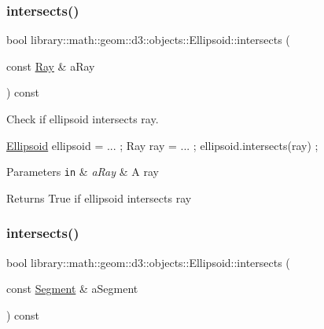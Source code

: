\subsubsection{\texorpdfstring{intersects()}{intersects()}\hspace{0.1cm}{\footnotesize\ttfamily [4/10]}}
{\footnotesize\ttfamily bool library\+::math\+::geom\+::d3\+::objects\+::\+Ellipsoid\+::intersects (\begin{DoxyParamCaption}\item[{const \hyperlink{classlibrary_1_1math_1_1geom_1_1d3_1_1objects_1_1_ray}{Ray} \&}]{a\+Ray }\end{DoxyParamCaption}) const}



Check if ellipsoid intersects ray. 


\begin{DoxyCode}
\hyperlink{classlibrary_1_1math_1_1geom_1_1d3_1_1objects_1_1_ellipsoid_aae81fe0edc7f0e8d4590ea89ae73cb14}{Ellipsoid} ellipsoid = ... ;
Ray ray = ... ;
ellipsoid.intersects(ray) ;
\end{DoxyCode}



\begin{DoxyParams}[1]{Parameters}
\mbox{\tt in}  & {\em a\+Ray} & A ray \\
\hline
\end{DoxyParams}
\begin{DoxyReturn}{Returns}
True if ellipsoid intersects ray 
\end{DoxyReturn}
\mbox{\label{classlibrary_1_1math_1_1geom_1_1d3_1_1objects_1_1_ellipsoid_a6d447b106d193af47c6b201f7e01bd26}} 
\subsubsection{\texorpdfstring{intersects()}{intersects()}\hspace{0.1cm}{\footnotesize\ttfamily [5/10]}}
{\footnotesize\ttfamily bool library\+::math\+::geom\+::d3\+::objects\+::\+Ellipsoid\+::intersects (\begin{DoxyParamCaption}\item[{const \hyperlink{classlibrary_1_1math_1_1geom_1_1d3_1_1objects_1_1_segment}{Segment} \&}]{a\+Segment }\end{DoxyParamCaption}) const}



